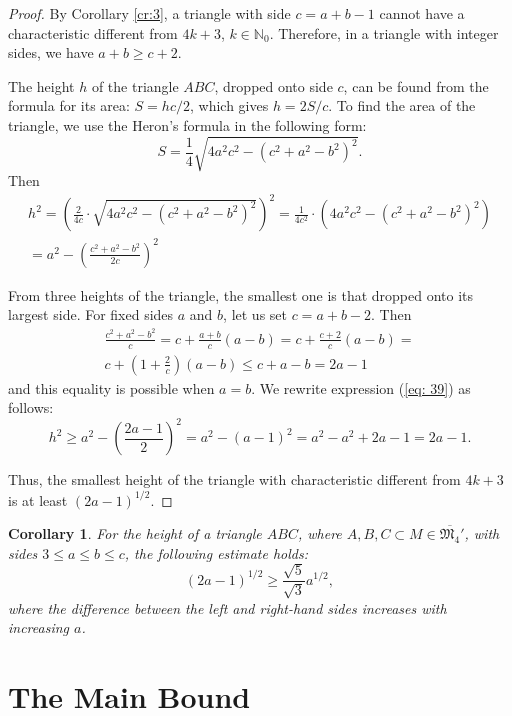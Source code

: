 \documentclass[a4paper,14pt]{article} %
\theoremstyle{plain}
\newtheorem{corollary}[theorem]{Corollary}
\theoremstyle{definition}
\begin{document}
\begin{proof}
	By Corollary \ref{cr:3}, a triangle with side $c=a+b-1$ cannot have a characteristic different from $4k+3$, $k\in \mathbb{N}_0$. Therefore, in a triangle with integer sides, we have $a+b\geq c+2.$

	The height $h$ of the triangle $ABC$, dropped onto side $c$, can be found from the formula for its area: $S=hc/2$, which gives $h=2S/c$. To find the area of the triangle, we use the Heron's formula in the following form:
	$$
	S=\frac{1}{4} \sqrt{4a^2c^2-(c^2+a^2-b^2)^2}.
	$$
	Then
	\begin{multline}
		\label{eq:39}
		h^2=\left( \frac{2}{4c} \cdot \sqrt{4a^2c^2-(c^2+a^2-b^2)^2}\right)^2
		=
		\frac{1}{4c^2} \cdot \left( 4a^2c^2-(c^2+a^2-b^2)^2 \right)
		\\
		=
		a^2- \left(\frac{c^2+a^2-b^2}{2c} \right)^2
	\end{multline}

	From three heights of the triangle, the smallest one is that dropped onto its largest side.
	For fixed sides $a$ and $b$, let us set $c=a+b-2$. Then
	\begin{multline}
		\label{eq: 40}
		\frac{c^2+a^2-b^2}{c}
		=
		c+\frac{a+b}{c}(a-b) = c+\frac{c+2}{c}(a-b)
		=
		\\
		c+\left(1+\frac{2}{c}\right)(a-b) \leq c+a-b=2a-1
	\end{multline}
	and this equality is possible when $a=b$. We rewrite expression (\ref{eq: 39}) as follows:
	$$
	h^2 \geq a^2- \left(\frac{2a-1}{2} \right)^2=a^2-(a-1)^2=a^2-a^2+2a-1=2a-1.
	$$

	Thus, the smallest height of the triangle with characteristic different from $4k+3$ is at least $(2a-1)^{1/2}$.
\end{proof}



\begin{corollary}
	\label{cor:sqrt_5_3}
	For the height of a triangle $ABC$, where ${A, B, C} \subset M \in \overline{\mathfrak{M}_4}'$, with sides $3 \leq a \leq b \leq c$, the following estimate holds:
	$$
		(2a-1)^{1/2} \geq \frac{\sqrt{5}}{\sqrt{3}} a^{1/2},
	$$
	where the difference between the left and right-hand sides increases with increasing $a$.
\end{corollary}

\section{The Main Bound}
\end{document}
